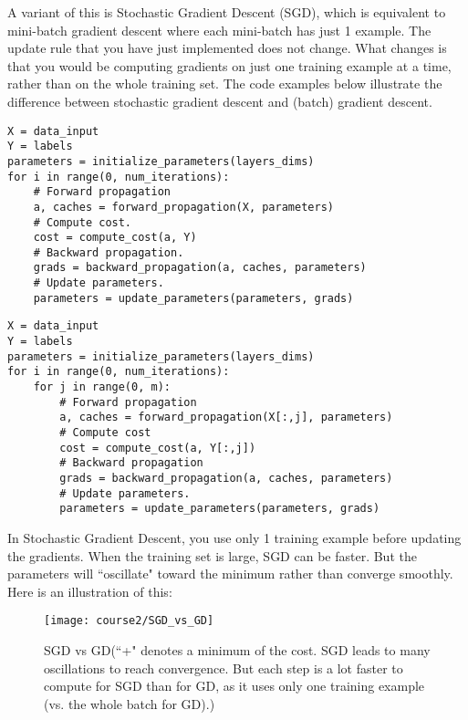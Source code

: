 {A variant of this is Stochastic Gradient Descent (SGD), which is equivalent to mini-batch gradient descent where each mini-batch has just 1 example. The update rule that you have just implemented does not change. What changes is that you would be computing gradients on just one training example at a time, rather than on the whole training set. The code examples below illustrate the difference between stochastic gradient descent and (batch) gradient descent.
\begin{tcolorbox}[title=(Batch) Gradient Descent]
\begin{verbatim}
X = data_input
Y = labels
parameters = initialize_parameters(layers_dims)
for i in range(0, num_iterations):
    # Forward propagation
    a, caches = forward_propagation(X, parameters)
    # Compute cost.
    cost = compute_cost(a, Y)
    # Backward propagation.
    grads = backward_propagation(a, caches, parameters)
    # Update parameters.
    parameters = update_parameters(parameters, grads)
\end{verbatim}
\end{tcolorbox}

\clearpage
\begin{tcolorbox}[title=Stochastic Gradient Descent]
\begin{verbatim}
X = data_input
Y = labels
parameters = initialize_parameters(layers_dims)
for i in range(0, num_iterations):
    for j in range(0, m):
        # Forward propagation
        a, caches = forward_propagation(X[:,j], parameters)
        # Compute cost
        cost = compute_cost(a, Y[:,j])
        # Backward propagation
        grads = backward_propagation(a, caches, parameters)
        # Update parameters.
        parameters = update_parameters(parameters, grads)
\end{verbatim}
\end{tcolorbox}

In Stochastic Gradient Descent, you use only 1 training example before updating the gradients. When the training set is large, SGD can be faster. But the parameters will ``oscillate" toward the minimum rather than converge smoothly. Here is an illustration of this:

\begin{figure}[h]
\begin{center}
\texttt{[image: course2/SGD\_vs\_GD]}
\end{center}
\caption{ SGD vs GD(``+" denotes a minimum of the cost. SGD leads to many oscillations to reach convergence. But each step is a lot faster to compute for SGD than for GD, as it uses only one training example (vs. the whole batch for GD).)}
\label{fig:SGD_vs_GD}
\end{figure}


}
